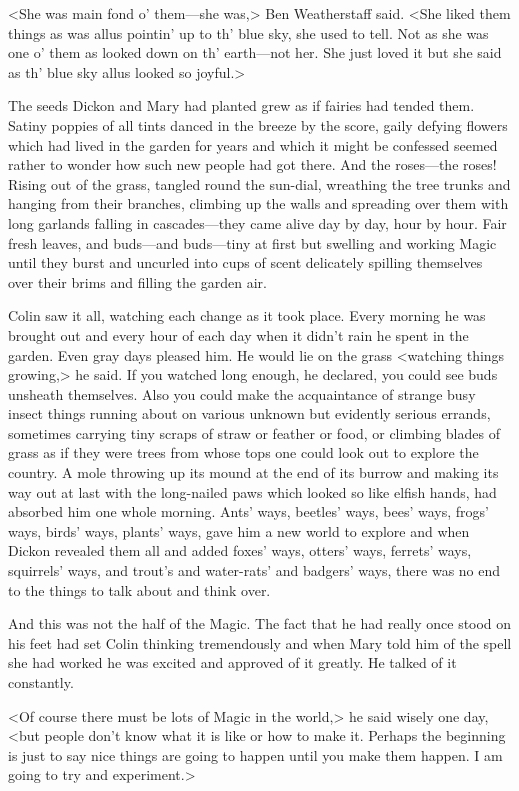 <She was main fond o' them—she was,> Ben Weatherstaff said. <She liked them things as was allus pointin' up to th' blue sky, she used to tell. Not as she was one o' them as looked down on th' earth—not her. She just loved it but she said as th' blue sky allus looked so joyful.>

The seeds Dickon and Mary had planted grew as if fairies had tended them. Satiny poppies of all tints danced in the breeze by the score, gaily defying flowers which had lived in the garden for years and which it might be confessed seemed rather to wonder how such new people had got there. And the roses—the roses! Rising out of the grass, tangled round the sun-dial, wreathing the tree trunks and hanging from their branches, climbing up the walls and spreading over them with long garlands falling in cascades—they came alive day by day, hour by hour. Fair fresh leaves, and buds—and buds—tiny at first but swelling and working Magic until they burst and uncurled into cups of scent delicately spilling themselves over their brims and filling the garden air.

Colin saw it all, watching each change as it took place. Every morning he was brought out and every hour of each day when it didn't rain he spent in the garden. Even gray days pleased him. He would lie on the grass <watching things growing,> he said. If you watched long enough, he declared, you could see buds unsheath themselves. Also you could make the acquaintance of strange busy insect things running about on various unknown but evidently serious errands, sometimes carrying tiny scraps of straw or feather or food, or climbing blades of grass as if they were trees from whose tops one could look out to explore the country. A mole throwing up its mound at the end of its burrow and making its way out at last with the long-nailed paws which looked so like elfish hands, had absorbed him one whole morning. Ants' ways, beetles' ways, bees' ways, frogs' ways, birds' ways, plants' ways, gave him a new world to explore and when Dickon revealed them all and added foxes' ways, otters' ways, ferrets' ways, squirrels' ways, and trout's and water-rats' and badgers' ways, there was no end to the things to talk about and think over.

And this was not the half of the Magic. The fact that he had really once stood on his feet had set Colin thinking tremendously and when Mary told him of the spell she had worked he was excited and approved of it greatly. He talked of it constantly.

<Of course there must be lots of Magic in the world,> he said wisely one day, <but people don't know what it is like or how to make it. Perhaps the beginning is just to say nice things are going to happen until you make them happen. I am going to try and experiment.>

